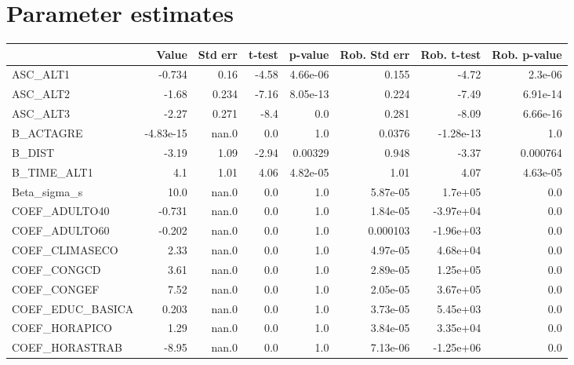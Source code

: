 \section{Parameter estimates}
\begin{tabular}{lrrrrrrr}
\toprule
{} &     Value &  Std err &  t-test &  p-value &  Rob. Std err &  Rob. t-test &  Rob. p-value \\
\midrule
ASC\_ALT1         &    -0.734 &     0.16 &   -4.58 & 4.66e-06 &         0.155 &        -4.72 &       2.3e-06 \\
ASC\_ALT2         &     -1.68 &    0.234 &   -7.16 & 8.05e-13 &         0.224 &        -7.49 &      6.91e-14 \\
ASC\_ALT3         &     -2.27 &    0.271 &    -8.4 &      0.0 &         0.281 &        -8.09 &      6.66e-16 \\
B\_ACTAGRE        & -4.83e-15 &    nan.0 &     0.0 &      1.0 &        0.0376 &    -1.28e-13 &           1.0 \\
B\_DIST           &     -3.19 &     1.09 &   -2.94 &  0.00329 &         0.948 &        -3.37 &      0.000764 \\
B\_TIME\_ALT1      &       4.1 &     1.01 &    4.06 & 4.82e-05 &          1.01 &         4.07 &      4.63e-05 \\
Beta\_sigma\_s     &      10.0 &    nan.0 &     0.0 &      1.0 &      5.87e-05 &      1.7e+05 &           0.0 \\
COEF\_ADULTO40    &    -0.731 &    nan.0 &     0.0 &      1.0 &      1.84e-05 &    -3.97e+04 &           0.0 \\
COEF\_ADULTO60    &    -0.202 &    nan.0 &     0.0 &      1.0 &      0.000103 &    -1.96e+03 &           0.0 \\
COEF\_CLIMASECO   &      2.33 &    nan.0 &     0.0 &      1.0 &      4.97e-05 &     4.68e+04 &           0.0 \\
COEF\_CONGCD      &      3.61 &    nan.0 &     0.0 &      1.0 &      2.89e-05 &     1.25e+05 &           0.0 \\
COEF\_CONGEF      &      7.52 &    nan.0 &     0.0 &      1.0 &      2.05e-05 &     3.67e+05 &           0.0 \\
COEF\_EDUC\_BASICA &     0.203 &    nan.0 &     0.0 &      1.0 &      3.73e-05 &     5.45e+03 &           0.0 \\
COEF\_HORAPICO    &      1.29 &    nan.0 &     0.0 &      1.0 &      3.84e-05 &     3.35e+04 &           0.0 \\
COEF\_HORASTRAB   &     -8.95 &    nan.0 &     0.0 &      1.0 &      7.13e-06 &    -1.25e+06 &           0.0 \\

\end{tabular}
